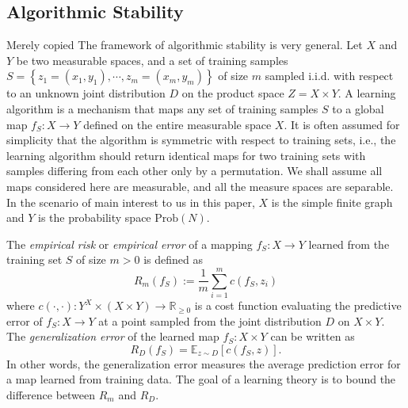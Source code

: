 \documentclass[letterpaper]{article} %
\begin{document}


\subsection{Algorithmic Stability}  {\color{red}Merely copied}
The framework of algorithmic stability \cite{DW1979,Algorithmic_Stability} is very general. Let $X$ and $Y$ be two measurable spaces, and a set of training samples $S=\left\{ z_1=\left( x_1,y_1 \right),\cdots,z_m= \left( x_m, y_m \right) \right\}$ of size $m$ sampled i.i.d. with respect to an unknown joint distribution $D$ on the product space $Z=X\times Y$. A learning algorithm is a mechanism that maps any set of training samples $S$ to a global map $f_S:X\rightarrow Y$ defined on the entire measurable space $X$. It is often assumed for simplicity that the algorithm is symmetric with respect to training sets, i.e., the learning algorithm should return identical maps for two training sets with samples differing from each other only by a permutation. We shall assume all maps considered here are measurable, and all the measure spaces are separable. In the scenario of main interest to us in this paper, $X$ is the simple finite graph and $Y$ is the probability space $\mathrm{Prob}\left( N \right)$.

The \emph{empirical risk} or \emph{empirical error} of a mapping $f_S:X\rightarrow Y$ learned from the training set $S$ of size $m>0$ is defined as
\begin{equation*}
  R_m \left( f_S \right):=\frac{1}{m}\sum_{i=1}^mc \left( f_S, z_i \right)
\end{equation*}
where $c \left( \cdot,\cdot \right):Y^X\times \left( X\times Y \right)\rightarrow\mathbb{R}_{\geq0}$ is a cost function evaluating the predictive error of $f_S:X\rightarrow Y$ at a point sampled from the joint distribution $D$ on $X\times Y$. The \emph{generalization error} of the learned map $f_S:X\times Y$ can be written as
\begin{equation*}
  R_D \left( f_S \right)=\mathbb{E}_{z\sim D} \left[ c \left( f_S,z \right) \right].
\end{equation*}
In other words, the generalization error measures the average prediction error for a map learned from  training data. The goal of a learning theory is to bound the difference between $R_m$ and $R_D$.
\end{document}
